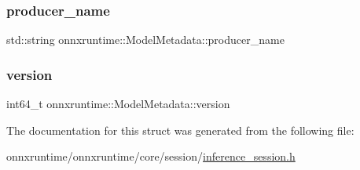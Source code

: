 \subsubsection{\texorpdfstring{producer\+\_\+name}{producer\_name}}
{\footnotesize\ttfamily std\+::string onnxruntime\+::\+Model\+Metadata\+::producer\+\_\+name}

\mbox{\label{structonnxruntime_1_1ModelMetadata_a0450f7de9dfc928d5c6cee26fc1453a3}} 
\subsubsection{\texorpdfstring{version}{version}}
{\footnotesize\ttfamily int64\+\_\+t onnxruntime\+::\+Model\+Metadata\+::version}



The documentation for this struct was generated from the following file\+:\begin{DoxyCompactItemize}
\item 
onnxruntime/onnxruntime/core/session/\mbox{\hyperlink{inference__session_8h}{inference\+\_\+session.\+h}}\end{DoxyCompactItemize}
